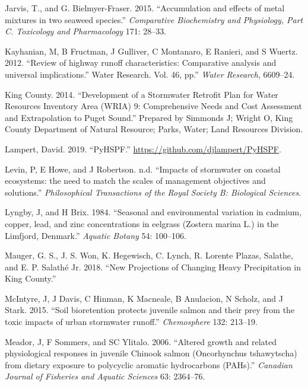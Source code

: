 \documentclass[
]{report}
\begin{document}
\leavevmode\hypertarget{ref-Jarvis2015}{}%
Jarvis, T., and G. Bielmyer-Fraser. 2015. ``Accumulation and effects of metal mixtures in two seaweed species.'' \emph{Comparative Biochemistry and Physiology, Part C. Toxicology and Pharmacology} 171: 28--33.

\leavevmode\hypertarget{ref-Kayhanian2012}{}%
Kayhanian, M, B Fructman, J Gulliver, C Montanaro, E Ranieri, and S Wuertz. 2012. ``Review of highway runoff characteristics: Comparative analysis and universal implications.'' Water Research. Vol. 46, pp.'' \emph{Water Research}, 6609--24.

\leavevmode\hypertarget{ref-County2014}{}%
King County. 2014. ``Development of a Stormwater Retrofit Plan for Water Resources Inventory Area (WRIA) 9: Comprehensive Needs and Cost Assessment and Extrapolation to Puget Sound.'' Prepared by Simmonds J; Wright O, King County Department of Natural Resource; Parks, Water; Land Resources Division.

\leavevmode\hypertarget{ref-Lampert2019}{}%
Lampert, David. 2019. ``PyHSPF.'' \url{https://github.com/djlampert/PyHSPF}.

\leavevmode\hypertarget{ref-Levin}{}%
Levin, P, E Howe, and J Robertson. n.d. ``Impacts of stormwater on coastal ecosystems: the need to match the scales of management objectives and solutions.'' \emph{Philosophical Transactions of the Royal Society B: Biological Sciences}.

\leavevmode\hypertarget{ref-Lyngby1984}{}%
Lyngby, J, and H Brix. 1984. ``Seasonal and environmental variation in cadmium, copper, lead, and zinc concentrations in eelgrass (Zostera marina L.) in the Limfjord, Denmark.'' \emph{Aquatic Botany} 54: 100--106.

\leavevmode\hypertarget{ref-Jr2018}{}%
Mauger, G. S., J. S. Won, K. Hegewisch, C. Lynch, R. Lorente Plazas, Salathe, and E. P. Salathé Jr. 2018. ``New Projections of Changing Heavy Precipitation in King County.''

\leavevmode\hypertarget{ref-McIntyre2015}{}%
McIntyre, J, J Davis, C Hinman, K Macneale, B Anulacion, N Scholz, and J Stark. 2015. ``Soil bioretention protects juvenile salmon and their prey from the toxic impacts of urban stormwater runoff.'' \emph{Chemosphere} 132: 213--19.

\leavevmode\hypertarget{ref-Meador2006}{}%
Meador, J, F Sommers, and SC Ylitalo. 2006. ``Altered growth and related physiological responses in juvenile Chinook salmon (Oncorhynchus tshawytscha) from dietary exposure to polycyclic aromatic hydrocarbons (PAHs).'' \emph{Canadian Journal of Fisheries and Aquatic Sciences} 63: 2364--76.
\end{document}
